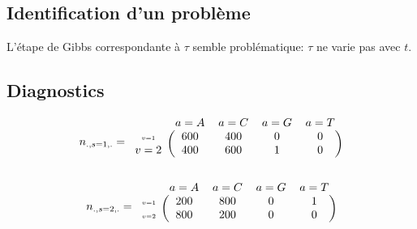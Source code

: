 \documentclass{beamer}
\begin{document}
\subsection{Identification d'un problème}
\begin{frame}
L'étape de Gibbs correspondante à $\tau$ semble problématique: $\tau$ ne varie pas avec $t$.
\end{frame}


\subsection{Diagnostics}


\begin{frame}
    $$n_{.,s=1,.}=\begin{blockarray}{ccccc}
    &a=A&a=C&a=G&a=T&\\
    \begin{block}{c(cccc)}
 {\scriptscriptstyle v=1}&600&400&0&0\\   
 v=2&400&600&1&0\\
    \end{block}
\end{blockarray} $$


$$n_{.,s=2,.}=\begin{blockarray}{ccccc}
    &a=A&a=C&a=G&a=T&\\
    \begin{block}{c(cccc)}
{\scriptscriptstyle v=1}&200&800&0&1\\   
  {\scriptscriptstyle v=2}&800&200&0&0\\
    \end{block}
\end{blockarray} $$


\end{frame}
\end{document}
